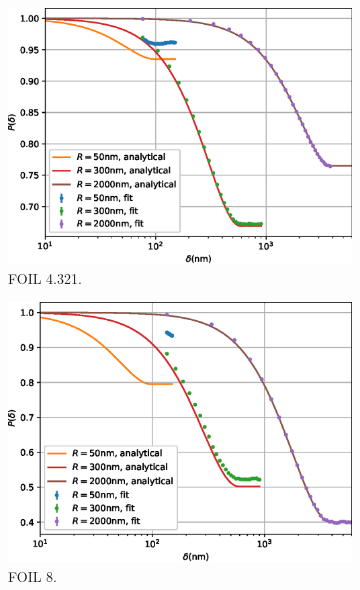 \begin{figure}[p]
	\centering
	\begin{subfigure}[b]{0.45\textwidth}
		\centering
		\includegraphics[width=\textwidth]{simulation-plot-rms-FOIL-4.321}
		\caption{FOIL 4.321.}
		\label{fig:simulation-plot-rms-FOIL-4.321}
	\end{subfigure}
	\hfill
	\begin{subfigure}[b]{0.45\textwidth}
		\centering
		\includegraphics[width=\textwidth]{simulation-plot-rms-FOIL-8}
		\caption{FOIL 8.}
		\label{fig:simulation-plot-rms-FOIL-8}
	\end{subfigure}
	\centering
	\begin{subfigure}[b]{0.45\textwidth}
		\centering

\end{subfigure}
\end{figure}

